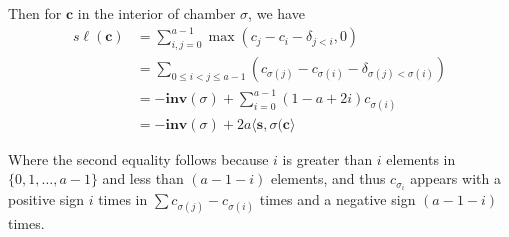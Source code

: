 \documentclass{amsart}[12pt]
\theoremstyle{definition}
\newcommand{\sk}{s\ell}
\newcommand{\inv}{\mathbf{inv}}
\begin{document}
Then for $\mathbf{c}$ in the interior of chamber $\sigma$, we have
\begin{align*}
\sk(\mathbf{c})&= \sum_{i,j=0}^{a-1}  \max(c_j-c_i-\delta_{j<i}, 0) \\
 &=\sum_{0\leq i<j\leq a-1} (c_{\sigma(j)}-c_{\sigma(i)}-\delta_{\sigma(j)<\sigma(i)}) \\
                &=-\inv(\sigma)+\sum_{i=0}^{a-1}(1-a+2i)c_{\sigma(i)}\\
&=-\inv(\sigma)+2a\langle\mathbf{s},\sigma(\mathbf{c}\rangle
\end{align*}

Where the second equality follows because $i$ is greater than $i$ elements in $\{0,1,\dots,a-1\}$ and less than $(a-1-i)$ elements, and thus $c_{\sigma_i}$ appears with a positive sign $i$ times in $\sum c_{\sigma(j)}-c_{\sigma(i)}$ times and a negative sign $(a-1-i)$ times.
\end{document}
